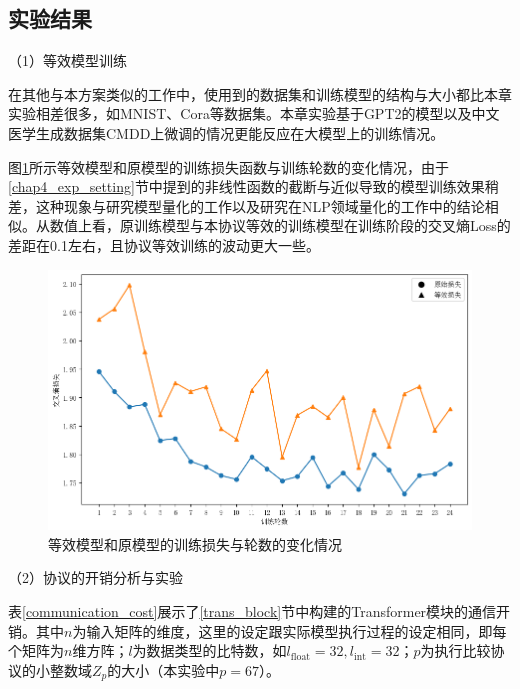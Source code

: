 \subsection{实验结果}

（1）等效模型训练

在其他与本方案类似的工作中\cite{secureml, secgnn, SecureNN}，使用到的数据集和训练模型的结构与大小都比本章实验相差很多，如MNIST、Cora等数据集。本章实验基于GPT2的模型以及中文医学生成数据集CMDD上微调的情况更能反应在大模型上的训练情况。

图\ref{Chap4_clip_param_Loss}所示等效模型和原模型的训练损失函数与训练轮数的变化情况，由于\ref{chap4_exp_setting}节中提到的非线性函数的截断与近似导致的模型训练效果稍差，这种现象与研究模型量化的工作\cite{fixpoint_bp_train, Post_training_piecewise_lin}以及研究在NLP领域量化\cite{gupta2020compression, zafrir2019q8bert}的工作中的结论相似。从数值上看，原训练模型与本协议等效的训练模型在训练阶段的交叉熵Loss的差距在0.1左右，且协议等效训练的波动更大一些。
\begin{figure}[h]
	\centering
	\includegraphics[width=0.8\linewidth]{figures/Chap4_clip_param_Loss.png}
	\caption{等效模型和原模型的训练损失与轮数的变化情况}
	\label{Chap4_clip_param_Loss}
\end{figure}


（2）协议的开销分析与实验

表\ref{communication_cost}展示了\ref{trans_block}节中构建的Transformer模块的通信开销。其中$n$为输入矩阵的维度，这里的设定跟实际模型执行过程的设定相同，即每个矩阵为$n$维方阵；$l$为数据类型的比特数，如$l_{\text{float}}=32, l_{\text{int}}=32$；$p$为执行比较协议的小整数域$Z_p$的大小（本实验中$p=67$）。

